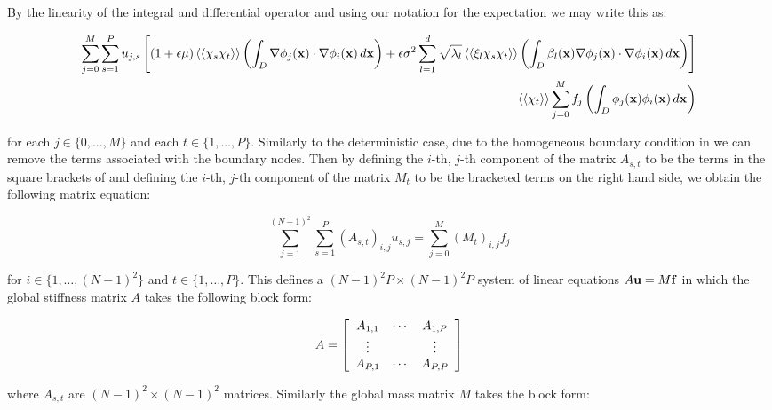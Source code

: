 By the linearity of the integral and differential operator and using our
notation for the expectation  we may
write this as:

\begin{align}\label{eq:twod-stochastic-discrete}
  \begin{split}
      \sum_{j=0}^M\sum_{s=1}^Pu_{j,s}\left[(1 + \epsilon\mu)\left\langle\langle\chi_s\chi_t\right\rangle\rangle
      \left(\int_D\nabla\phi_j(\mathbf{x})\cdot\nabla\phi_i(\mathbf{x})\, d\mathbf{x}\right) +
      \epsilon\sigma^2\sum_{l=1}^d\sqrt{\lambda_l}\left\langle\langle\xi_l\chi_s\chi_t\right\rangle\rangle
      \left(\int_D\beta_l(\mathbf{x})\nabla\phi_j(\mathbf{x})\cdot\nabla\phi_i(\mathbf{x})\, d\mathbf{x}\right)\right] \\
      \left\langle\langle\chi_t\right\rangle\rangle\sum_{j=0}^Mf_j\left(\int_D\phi_j(\mathbf{x})\phi_i(\mathbf{x})\, d\mathbf{x}\right)
  \end{split}
\end{align}

for each $j \in \{0,\ldots,M\}$ and each $t \in \{1, \ldots, P\}$. Similarly to
the deterministic case, due to the homogeneous boundary condition in
 we can remove the terms associated with the boundary
nodes. Then by defining the $i$-th, $j$-th component of the matrix $A_{s,t}$ to
be the terms in the square brackets of  and
defining the $i$-th, $j$-th component of the matrix $M_t$ to be the bracketed
terms on the right hand side, we obtain the following matrix equation:

\begin{equation}
    \sum_{j=1}^{(N-1)^2}\sum_{s=1}^P(A_{s,t})_{i,j}u_{s,j} =
    \sum_{j=0}^M(M_t)_{i,j}f_j
\end{equation}

for $i \in \{1, \ldots, (N-1)^2\}$ and $t \in \{1,\ldots,P\}$. This defines a
$(N-1)^2P \times (N-1)^2P$ system of linear equations $A\mathbf{u} = M\mathbf{f}$ in
which the global stiffness matrix $A$ takes the following block form:

\begin{equation}
    A = \left[\begin{array}{c c c}
        A_{1,1} & \cdots & A_{1,P} \\
        \vdots & & \vdots \\
        A_{P,1} & \cdots & A_{P,P}
    \end{array}\right]
\end{equation}

where $A_{s,t}$ are $(N-1)^2 \times (N-1)^2$ matrices. Similarly the global
mass matrix $M$ takes the block form:

